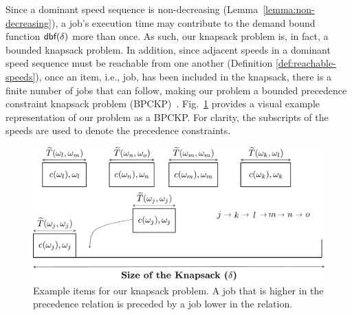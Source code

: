 Since a dominant speed sequence is non-decreasing (Lemma~\ref{lemma:non-decreasing}), a job's execution time may contribute to the demand bound function $\mbox{\sf dbf}(\delta)$ more than once.
As such, our knapsack problem is, in fact, a bounded knapsack problem.
In addition, since  adjacent speeds in a dominant speed sequence must be reachable from one another (Definition \ref{def:reachable-speeds}), once an item, i.e., job, has been included in the knapsack, there is a finite number of jobs that can follow, making our problem a bounded precedence constraint knapsack problem (BPCKP)~\cite{cho_depth-first_1997,johnson_knapsacks_1983}.
Fig.~\ref{fig:Knapsack1} provides a visual example representation of our problem as a BPCKP.
For clarity, the subscripts of the speeds are used to denote the precedence constraints.
\begin{figure}
\centering
\includegraphics[width=1.0\linewidth]{fig/vectorKnapsackv2.pdf}
\caption{Example items for our knapsack problem. A job that is higher in the precedence relation is preceded by a job lower in the relation.}
\label{fig:Knapsack1}
\end{figure}



